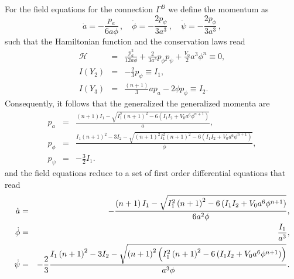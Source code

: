 \documentclass[onecolumn,superscriptaddress,secnumarabic,nobibnotes,aps,prd,nofootinbib,altaffilletter,11pt]{revtex4}
\begin{document}
For the field equations for the connection $\Gamma ^{B}$ we define the
momentum as%
\begin{equation}
\dot{a} =-\frac{p_{a}}{6a\phi }\,, \quad
\dot{\phi} = -\frac{2p_{\psi }}{3a^{3}}\,, \quad
\dot{\psi} = -\frac{2p_{\phi }}{3a^{3}}\,,    
\end{equation}
such that the Hamiltonian function and the conservation laws read%
\begin{eqnarray}
\mathcal{H} &=&\frac{p_{a}^{2}}{12a\phi }+\frac{2}{3a^{3}}p_{\phi }p_{\psi }+%
\frac{V_{0}}{2}a^{3}\phi ^{n}\equiv 0, \\
I\left( Y_{2}\right) &=&-\frac{2}{3}p_{\psi }\equiv I_{1}, \\
I\left( Y_{3}\right) &=&\frac{\left( n+1\right) }{3}ap_{a}-2\phi p_{\phi
}\equiv I_{2}.
\end{eqnarray}
Consequently, it follows that the generalized the generalized momenta are
\begin{eqnarray}
p_{a} &=&\frac{\left( n+1\right) I_{1}-\sqrt{I_{1}^{2}\left( n+1\right)
^{2}-6\left( I_{1}I_{2}+V_{0}a^{6}\phi ^{n+1}\right) }}{a}, \\
p_{\phi } &=&\frac{I_{1}\left( n+1\right) ^{2}-3I_{2}-\sqrt{\left(
n+1\right) ^{2}I_{1}^{2}\left( n+1\right) ^{2}-6\left(
I_{1}I_{2}+V_{0}a^{6}\phi ^{n+1}\right) }}{\phi }, \\
p_{\psi } &=&-\frac{3}{2}I_{1}.
\end{eqnarray}%
and the field equations reduce to a set of first order differential equations that read
\begin{eqnarray}
\dot{a} &=&-\frac{\left( n+1\right) I_{1}-\sqrt{I_{1}^{2}\left( n+1\right)
^{2}-6\left( I_{1}I_{2}+V_{0}a^{6}\phi ^{n+1}\right) }}{6a^{2}\phi },
\label{ll01} \\
\dot{\phi} &=&\frac{I_{1}}{a^{3}},  \label{ll02} \\
\dot{\psi} &=&-\frac{2}{3}\frac{I_{1}\left( n+1\right) ^{2}-3I_{2}-\sqrt{%
\left( n+1\right) ^{2}\left( I_{1}^{2}\left( n+1\right) ^{2}-6\left(
I_{1}I_{2}+V_{0}a^{6}\phi ^{n+1}\right) \right) }}{a^{3}\phi }.
\end{eqnarray}
\end{document}
